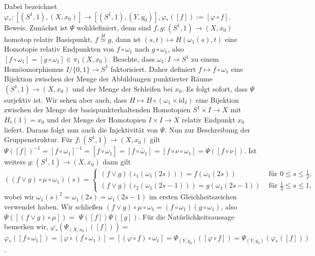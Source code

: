 \documentclass[10pt, letterpaper]{article}
\begin{document}
Dabei bezeichnet $\varphi_{*}:\left[\left(S^{1}, 1\right),\left(X, x_{0}\right)\right] \rightarrow\left[\left(S^{1}, 1\right),\left(Y, y_{0}\right)\right], \varphi_{*}([f]):=[\varphi \circ f]$.\\
Beweis. Zunächst ist $\Psi$ wohldefiniert, denn sind $f, g:\left(S^{1}, 1\right) \rightarrow\left(X, x_{0}\right)$ homotop relativ Basispunkt, $f \stackrel{H}{\simeq} g$, dann ist $(s, t) \mapsto H\left(\omega_{1}(s), t\right)$ eine Homotopie relativ Endpunkten von $f \circ \omega_{1}$ nach $g \circ \omega_{1}$, also $\left[f \circ \omega_{1}\right]=\left[g \circ \omega_{1}\right] \in \pi_{1}\left(X, x_{0}\right)$. Beachte, dass $\omega_{1}: I \rightarrow S^{1}$ zu einem Homöomorphismus $I /\{0,1\} \rightarrow S^{1}$ faktorisiert. Daher definiert $f \mapsto f \circ \omega_{1}$ eine Bijektion zwischen der Menge der Abbildungen punktierter Räume $\left(S^{1}, 1\right) \rightarrow\left(X, x_{0}\right)$ und der Menge der Schleifen bei $x_{0}$. Es folgt sofort, dass $\Psi$ surjektiv ist. Wir sehen aber auch, dass $H \mapsto H \circ\left(\omega_{1} \times \mathrm{id}_{I}\right)$ eine Bijektion zwischen der Menge der basispunkterhaltenden Homotopien $S^{1} \times I \rightarrow X$ mit $H_{t}(1)=x_{0}$ und der Menge der Homotopien $I \times I \rightarrow X$ relativ Endpunkt $x_{0}$ liefert. Daraus folgt nun auch die Injektivität von $\Psi$. Nun zur Beschreibung der Gruppenstruktur. Für $f:\left(S^{1}, 1\right) \rightarrow\left(X, x_{0}\right)$ gilt $\Psi([f])^{-1}=\left[f \circ \omega_{1}\right]^{-1}=\left[\overline{f \circ \omega_{1}}\right]=\left[f \circ \bar{\omega}_{1}\right]=\left[f \circ \nu \circ \omega_{1}\right]=\Psi([f \circ \nu])$. Ist weiters $g:\left(S^{1}, 1\right) \rightarrow\left(X, x_{0}\right)$ dann gilt\\
$\left((f \vee g) \circ \mu \circ \omega_{1}\right)(s)= \begin{cases}(f \vee g)\left(\iota_{1}\left(\omega_{1}(2 s)\right)\right)=f\left(\omega_{1}(2 s)\right) & \text { für } 0 \leq s \leq \frac{1}{2}, \\ (f \vee g)\left(\iota_{2}\left(\omega_{1}(2 s-1)\right)\right)=g\left(\omega_{1}(2 s-1)\right) & \text { für } \frac{1}{2} \leq s \leq 1,\end{cases}$\\
wobei wir $\omega_{1}(s)^{2}=\omega_{1}(2 s)=\omega_{1}(2 s-1)$ im ersten Gleichheitszeichen verwendet haben. Wir schließen $(f \vee g) \circ \mu \circ \omega_{1}=\left(f \circ \omega_{1}\right)\left(g \circ \omega_{1}\right)$, also $\Psi([(f \vee g) \circ \mu])=$ $\Psi([f]) \Psi([g])$. Für die Natürlichkeitsaussage bemerken wir, $\varphi_{*}\left(\Psi_{\left(X, x_{0}\right)}([f])\right)=$ $\varphi_{*}\left(\left[f \circ \omega_{1}\right]\right)=\left[\varphi \circ\left(f \circ \omega_{1}\right)\right]=\left[(\varphi \circ f) \circ \omega_{1}\right]=\Psi_{\left(Y, y_{0}\right)}([\varphi \circ f])=\Psi_{\left(Y, y_{0}\right)}\left(\varphi_{*}([f])\right)$.
\end{document}
